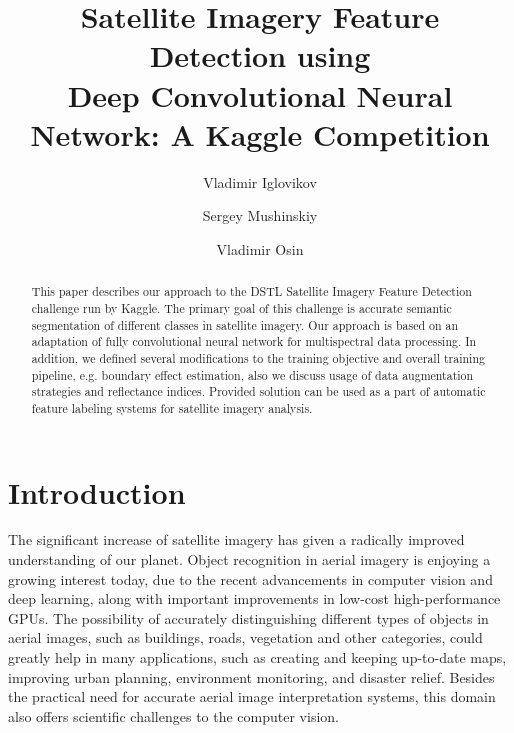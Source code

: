 \documentclass[10pt,twocolumn,letterpaper]{article}
\begin{document}
\title{Satellite Imagery Feature Detection using \\ Deep Convolutional Neural Network: A Kaggle Competition}

\author[1]{Vladimir Iglovikov}
\author[2]{Sergey Mushinskiy}
\author[3]{Vladimir Osin}


\renewcommand\Authands{ and }

\maketitle

\begin{abstract}
This paper describes our approach to the DSTL Satellite Imagery Feature Detection challenge run by Kaggle. The primary goal of this challenge is accurate semantic segmentation of different classes in satellite imagery. Our approach is based on an adaptation of fully convolutional neural network for multispectral data processing.  In addition, we defined several modifications to the training objective and overall training pipeline, e.g. boundary effect estimation, also we discuss usage of data augmentation strategies and reflectance indices. Provided solution can be used as a part of automatic feature labeling systems for satellite imagery analysis.
\end{abstract}

\section{Introduction}
The significant increase of satellite imagery has given a radically improved understanding of our planet. Object recognition in aerial imagery is enjoying a growing interest today, due to the recent advancements in computer vision and deep learning, along with important improvements in low-cost high-performance GPUs. The possibility of accurately distinguishing different types of objects in aerial images, such as buildings, roads, vegetation and other categories, could greatly help in many applications, such as creating and keeping up-to-date maps, improving urban planning, environment monitoring, and disaster relief. Besides the practical need for accurate aerial image interpretation systems, this domain also offers scientific challenges to the computer vision.
\end{document}
